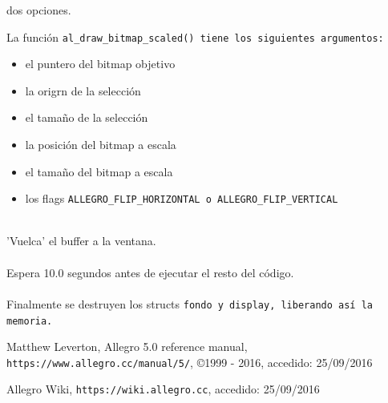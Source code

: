 \documentclass[11pt]{article}
\begin{document}
dos opciones.

La función \tt al\_draw\_bitmap\_scaled() \rm tiene los siguientes argumentos:
\begin{itemize}
\item el puntero del bitmap objetivo
\item la origrn de la selección
\item el tamaño de la selección
\item la posición del bitmap a escala
\item el tamaño del bitmap a escala
\item los flags \tt ALLEGRO\_FLIP\_HORIZONTAL\rm \ o \tt ALLEGRO\_FLIP\_VERTICAL\rm
\end{itemize}


\\

'Vuelca' el buffer a la ventana.\\

\\

Espera 10.0 segundos antes de ejecutar el resto del código.\\

\\

Finalmente se destruyen los structs \tt fondo \rm y \tt display\rm , liberando así la memoria.
\vfill
\begin{thebibliography}{9}
     Matthew Leverton, 
     Allegro 5.0 reference manual, 
     \verb!https://www.allegro.cc/manual/5/!, 
     \copyright 1999 - 2016,
     accedido: 25/09/2016
     
     Allegro Wiki,
     \verb!https://wiki.allegro.cc!,
     accedido: 25/09/2016
\end{thebibliography}
\end{document}
